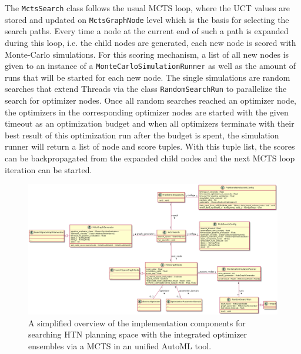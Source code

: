 The \texttt{MctsSearch} class follows the usual MCTS loop, where the UCT values are stored and updated on \texttt{MctsGraphNode} level which is the basis for selecting the search paths.
Every time a node at the current end of such a path is expanded during this loop, i.e. the child nodes are generated, each new node is scored with Monte-Carlo simulations.\newline
For this scoring mechanism, a list of all new nodes is given to an instance of a \texttt{MonteCarloSimulationRunner} as well as the amount of runs that will be started for each new node.
The single simulations are random searches that extend Threads via the class \texttt{RandomSearchRun} to parallelize the search for optimizer nodes.
Once all random searches reached an optimizer node, the optimizers in the corresponding optimizer nodes are started with the given timeout as an optimization budget and when all optimizers terminate with their best result of this optimization run after the budget is spent, the simulation runner will return a list of node and score tuples.
With this tuple list, the scores can be backpropagated from the expanded child nodes and the next MCTS loop iteration can be started.

\begin{figure}[ht!]
    \centering
    \includegraphics[angle=90,origin=c,width=\textwidth,height=0.7\textheight,keepaspectratio]{gfx/Figures/Implementation/mcts/MctsAutoML.png}
    \caption{A simplified overview of the implementation components for searching HTN planning space with the integrated optimizer ensembles via a MCTS in an unified AutoML tool.}
    \label{fig:implementation:uml:mcts}
\end{figure}

